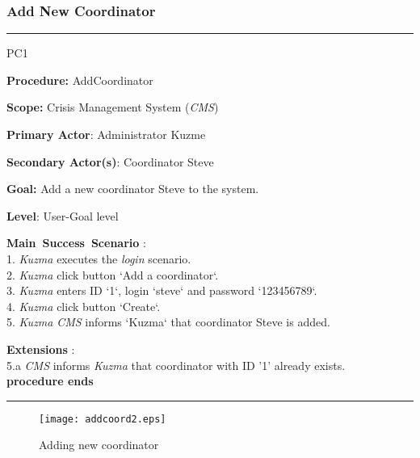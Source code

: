 \subsubsection{Add New Coordinator}
\vspace{0.5cm}
\hrule
\begin{lyxlist}{PC1}
\small{
\item [\textbf{Procedure:}] AddCoordinator
\item [\textbf{Scope:}] Crisis Management System (\emph{CMS})
\item [\textbf{Primary Actor}:] Administrator Kuzme
\item [\textbf{Secondary Actor(s)}:] Coordinator Steve
\item [\textbf{Goal:}] Add a new coordinator Steve to the system.
\item [\textbf{Level}:] User-Goal level
\item [\textbf{Main~Success~Scenario}]:\\
1. \emph{Kuzma} executes the \emph{login} scenario.\\
2. \emph{Kuzma} click button `Add a coordinator`.\\
3. \emph{Kuzma} enters ID `1`, login `steve` and password `123456789`. \\
4. \emph{Kuzma} click button `Create`. \\
5. \emph{Kuzma} \emph{CMS} informs `Kuzma` that coordinator Steve is added. 
\item [\textbf{Extensions}]:\\
5.a \emph{CMS} informs \emph{Kuzma} that coordinator with ID '1' already
exists.\\
\hspace*{0.5cm} \textbf{procedure ends}
}
\end{lyxlist}
\hrule
\vspace{0.5cm}

\begin{figure}[h]
    \texttt{[image: addcoord2.eps]}
	\caption{Adding new coordinator}
\end{figure}

